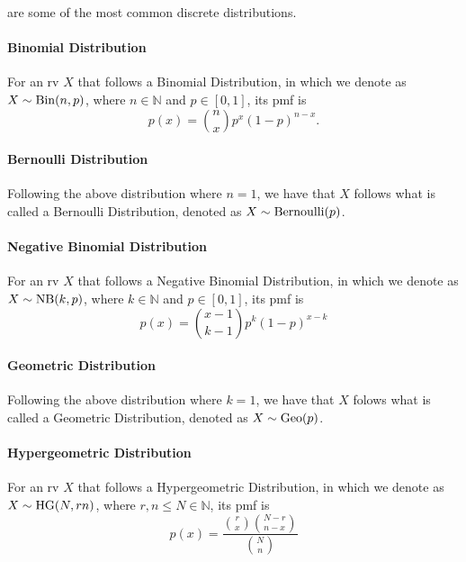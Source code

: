 \documentclass[notoc,notitlepage]{tufte-book}
\begin{document}
 are some of the most common discrete distributions.

\paragraph{Binomial Distribution} For an rv $X$
that follows a Binomial Distribution, in which we denote as $X \sim \operatorname{Bin}(n, p)$,
where $n \in \mathbb{N}$ and $p \in [0, 1]$, its pmf is
\begin{equation*}
  p(x) = \binom{n}{x} p^x (1 - p)^{n - x}.
\end{equation*}

\paragraph{Bernoulli Distribution} Following the
above distribution where $n = 1$, we have that $X$ follows what is called a
Bernoulli Distribution, denoted as $X \sim \operatorname{Bernoulli}(p)$.

\paragraph{Negative Binomial Distribution}
For an rv $X$ that follows a Negative Binomial Distribution, in which we denote
as $X \sim \operatorname{NB}(k, p)$, where $k \in \mathbb{N}$ and $p \in [0, 1]$, its pmf
is
\begin{equation*}
  p(x) = \binom{x - 1}{k - 1} p^k (1 - p)^{x - k}
\end{equation*}

\paragraph{Geometric Distribution} Following the
above distribution where $k = 1$, we have that $X$ folows what is called a
Geometric Distribution, denoted as $X \sim \operatorname{Geo}(p)$.

\paragraph{Hypergeometric Distribution} For
an rv $X$ that follows a Hypergeometric Distribution, in which we denote as $X
\sim \operatorname{HG}(N, r n)$, where $r, n \leq N \in \mathbb{N}$, its pmf is
\begin{equation*}
  p(x) = \frac{\binom{r}{x} \binom{N - r}{n - x}}{\binom{N}{n}}
\end{equation*}
\end{document}
